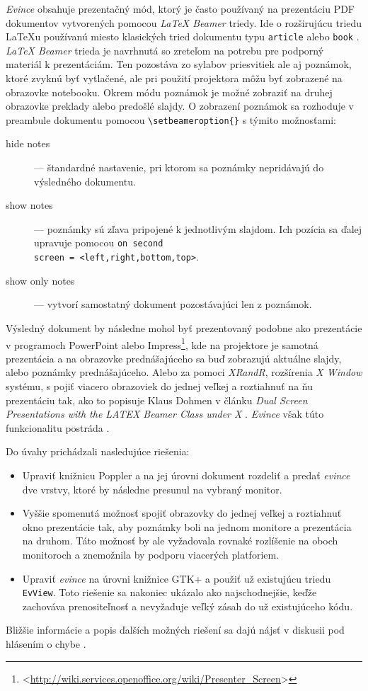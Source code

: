\documentclass[12pt,oneside,final]{fithesis2}
\begin{document}
\emph{Evince} obsahuje prezentačný mód, ktorý je často používaný na prezentáciu PDF dokumentov vytvorených pomocou \emph{LaTeX Beamer} triedy. Ide o rozširujúcu triedu LaTeXu používanú miesto klasických tried dokumentu typu \verb|article| alebo \verb|book| \cite{abclatex}. \emph{LaTeX Beamer} trieda je navrhnutá so zreteľom na potrebu pre podporný materiál k prezentáciám. Ten pozostáva zo sylabov priesvitiek ale aj poznámok, ktoré zvyknú byť vytlačené, ale pri použití projektora môžu byť zobrazené na obrazovke notebooku. Okrem módu poznámok je možné zobraziť na druhej obrazovke preklady alebo predošlé slajdy. O zobrazení poznámok sa rozhoduje v preambule dokumentu pomocou \verb|\setbeameroption{}| s týmito možnosťami:
\begin{description}
\item[hide notes] --- štandardné nastavenie, pri ktorom sa poznámky nepridávajú do výsledného dokumentu.
\item[show notes] --- poznámky sú zľava pripojené k jednotlivým slajdom. Ich pozícia sa ďalej upravuje pomocou \verb|on second| \\ \verb|screen = <left,right,bottom,top>|.
\item[show only notes]  --- vytvorí samostatný dokument pozostávajúci len z poznámok.
\end{description}
Výsledný dokument by následne mohol byť prezentovaný podobne ako prezentácie v programoch PowerPoint alebo Impress\footnote{<\url{http://wiki.services.openoffice.org/wiki/Presenter_Screen}>}, kde na projektore je samotná prezentácia a na obrazovke prednášajúceho sa buď zobrazujú aktuálne slajdy, alebo poznámky prednášajúceho. Alebo za pomoci \emph{XRandR}, rozšírenia \emph{X Window} systému, s pojiť viacero obrazoviek do jednej veľkej a roztiahnuť na ňu prezentáciu tak, ako to popisuje Klaus Dohmen v článku \emph{Dual Screen Presentations with the LATEX Beamer Class under X} \cite{dohmen}. \emph{Evince} však túto funkcionalitu postráda \cite{evbug}.

Do úvahy prichádzali nasledujúce riešenia:
\begin{itemize}
\item Upraviť knižnicu Poppler a na jej úrovni dokument rozdeliť a predať \emph{evince} dve vrstvy, ktoré by následne presunul na vybraný monitor.
\item Vyššie spomenutá možnosť spojiť obrazovky do jednej veľkej a roztiahnuť okno prezentácie tak, aby poznámky boli na jednom monitore a prezentácia na druhom. Táto možnosť by ale vyžadovala rovnaké rozlíšenie na oboch monitoroch a znemožnila by podporu viacerých platforiem.
\item Upraviť \emph{evince} na úrovni knižnice GTK+ a použiť už existujúcu triedu \verb|EvView|. Toto riešenie sa nakoniec ukázalo ako najschodnejšie, keďže zachováva prenositeľnosť a nevyžaduje veľký zásah do už existujúceho kódu.
\end{itemize}
Bližšie informácie a popis ďalších možných riešení sa dajú nájsť v diskusii pod hlásením o chybe \cite{evbug}.
\end{document}

